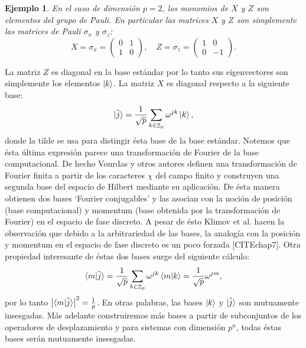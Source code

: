 \documentclass[a4paper]{report}
\DeclareMathOperator{\Z}{\mathbb{Z}}
\newtheorem{example}{Ejemplo}
\begin{document}
  \begin{example}
    En el caso de dimensión $p = 2$, los monomios de $X$ y
    $Z$ son elementos del \textit{grupo de Pauli}. En
    particular las matrices $X$ y $Z$ son simplemente las
    matrices de Pauli $\sigma_x$ y $\sigma_z$:
    \[
      X = \sigma_x =
      \begin{pmatrix} 0 & 1 \\ 1 & 0 \end{pmatrix},
      \quad
      Z = \sigma_z =
      \begin{pmatrix} 1 & 0 \\ 0 & -1 \end{pmatrix}. 
    \] 
  \end{example}
  La matriz $Z$ es diagonal en la base estándar por lo tanto
  sus eigenvectores son simplemente los elementos $\ket k$.
  La matriz $X$ es diagonal respecto a la siguiente base:
  \[
    \ket{\tilde j}
    = \frac{1}{\sqrt{p}} \sum_{k \in \Z_p}^{}
    \omega^{j k} \ket k,
  \] 
  donde la tilde se usa para distingir ésta base de la base
  estándar. Notemos que ésta última expresión parece una
  transformación de Fourier de la base computacional. De
  hecho Vourdas y otros autores definen una transformación
  de Fourier finita a partir de los caracteres $\chi$ del
  campo finito y construyen una segunda base del espacio de
  Hilbert mediante su aplicación. De ésta manera obtienen
  dos bases `Fourier conjugables' y las asocian con la
  noción de posición (base computacional) y momentum (base
  obtenida por la transformación de Fourier) en el espacio
  de fase discreto. A pesar de ésto Klimov et al. hacen la
  observación que debido a la arbitrariedad de las bases, la
  analogía con la posición y momentum en el espacio de fase
  discreto es un poco forzada [CITEchap7]. Otra propiedad
  interesante de éstas dos bases surge del siguiente cálculo:
  \begin{equation}
    \braket{m|\tilde j}
    = \frac{1}{\sqrt{p}}
    \sum_{k \in \Z_p}^{} \omega^{jk} \braket{m|k}
    = \frac{1}{\sqrt{p}} \omega^{jm},
  \end{equation}
  por lo tanto $\left|\braket{m|\tilde j}\right|^2 =
  \frac{1}{p}$. En otras palabras, las bases $\ket k$ y
  $\ket{\tilde j}$ son mutuamente insesgadas. Más adelante
  construiremos más bases a partir de subconjuntos de los
  operadores de desplazamiento y para sistemas con dimensión
  $p^{n}$, todas éstas bases serán mutuamente insesgadas.
\end{document}

